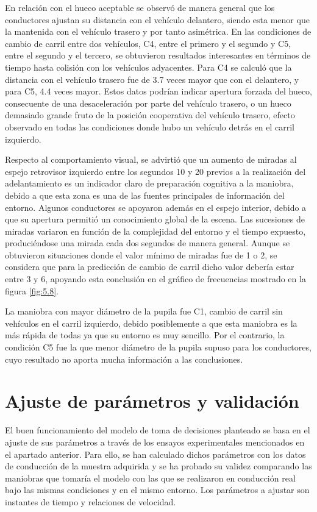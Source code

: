 En relación con el hueco aceptable se observó de manera general que los conductores ajustan su distancia con el vehículo delantero, siendo esta menor que la mantenida con el vehículo trasero y por tanto asimétrica. En las condiciones de cambio de carril entre dos vehículos, C4, entre el primero y el segundo y C5, entre el segundo y el tercero, se obtuvieron resultados interesantes en términos de tiempo hasta colisión con los vehículos adyacentes. Para C4 se calculó que la distancia con el vehículo trasero fue de 3.7 veces mayor que con el delantero, y para C5, 4.4 veces mayor. Estos datos podrían indicar apertura forzada del hueco, consecuente de una desaceleración por parte del vehículo trasero, o un hueco demasiado grande fruto de la posición cooperativa del vehículo trasero, efecto observado en todas las condiciones donde hubo un vehículo detrás en el carril izquierdo.

Respecto al comportamiento visual, se advirtió que un aumento de miradas al espejo retrovisor izquierdo entre los segundos 10 y 20 previos a la realización del adelantamiento es un indicador claro de preparación cognitiva a la maniobra, debido a que esta zona es una de las fuentes principales de información del entorno. Algunos conductores se apoyaron además en el espejo interior, debido a que su apertura permitió un conocimiento global de la escena. Las sucesiones de miradas variaron en función de la complejidad del entorno y el tiempo expuesto, produciéndose una mirada cada dos segundos de manera general. Aunque se obtuvieron situaciones donde el valor mínimo de miradas fue de 1 o 2, se considera que para la predicción de cambio de carril dicho valor debería estar entre 3 y 6, apoyando esta conclusión en el gráfico de frecuencias mostrado en la figura \ref{fig:5.8}.

La maniobra con mayor diámetro de la pupila fue C1, cambio de carril sin vehículos en el carril izquierdo, debido posiblemente a que esta maniobra es la más rápida de todas ya que su entorno es muy sencillo. Por el contrario, la condición C5 fue la que menor diámetro de la pupila supuso para los conductores, cuyo resultado no aporta mucha información a las conclusiones. 

\section{Ajuste de parámetros y validación}\label{54}

El buen funcionamiento del modelo de toma de decisiones planteado se basa en el ajuste de sus parámetros a través de los ensayos experimentales mencionados en el apartado anterior. Para ello, se han calculado dichos parámetros con los datos de conducción de la muestra adquirida y se ha probado su validez comparando las maniobras que tomaría el modelo con las que se realizaron en conducción real bajo las mismas condiciones y en el mismo entorno. Los parámetros a ajustar son instantes de tiempo y relaciones de velocidad.

